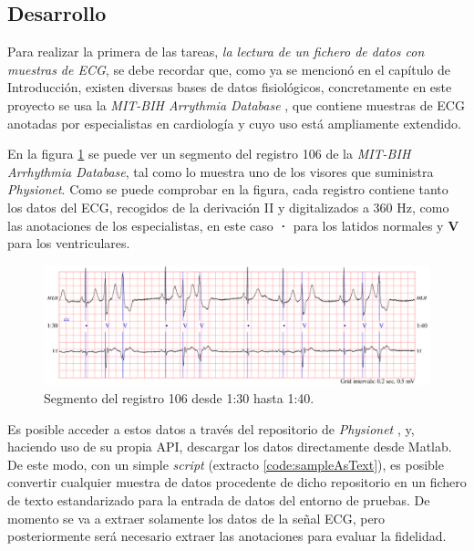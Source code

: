     \subsection{Desarrollo}

        Para realizar la primera de las tareas, \textit{la lectura de un fichero de datos con muestras de ECG}, se debe recordar que, como ya se mencionó en el capítulo de Introducción, existen diversas bases de datos fisiológicos, concretamente en este proyecto se usa la \textit{MIT-BIH Arrythmia Database} \cite{MIT-BIH}, que contiene  muestras de ECG anotadas por especialistas en cardiología y cuyo uso está ampliamente extendido. 
        
        En la figura \ref{fig:106} se puede ver un segmento del registro 106 de la \textit{MIT-BIH Arrhythmia Database}\cite{MIT-BIH}, tal como lo muestra uno de los visores que suministra \textit{Physionet}\cite{phisionet}. Como se puede comprobar en la figura, cada registro contiene tanto los datos del ECG, recogidos de la derivación II y digitalizados a 360 Hz, como las anotaciones de los especialistas, en este caso \textbf{·} para los latidos normales y \textbf{V} para los ventriculares.
        
        \begin{figure}[H]  
                \centering
                        \includegraphics[width =\linewidth]{figuras/MITBIH106.png}
                \caption{Segmento del registro 106 desde 1:30 hasta 1:40.}
                \label{fig:106}
        \end{figure}
        
        Es posible acceder a estos datos a través del repositorio de \textit{Physionet} \cite{phisionet}, y, haciendo uso de su propia API, descargar los datos directamente desde Matlab. De este modo, con un simple \textit{script} (extracto \ref{code:sampleAsText}), es posible convertir cualquier muestra de datos procedente de dicho repositorio en un fichero de texto estandarizado para la entrada de datos del entorno de pruebas. De momento se va a extraer solamente los datos de la señal ECG, pero posteriormente será necesario extraer las anotaciones para evaluar la fidelidad.
        
